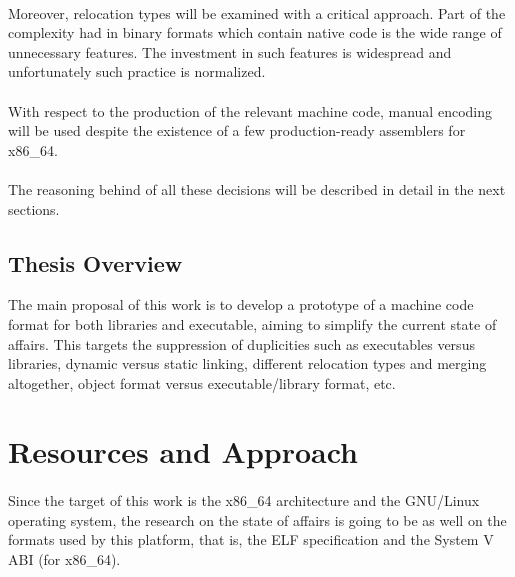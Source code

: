 \documentclass[12pt]{article}
\begin{document}
    \paragraph{}Moreover, relocation types will be examined with a critical approach. Part of the complexity had in binary formats which contain native code is the wide range of unnecessary features. The investment in such features is widespread and unfortunately such practice is normalized.
    
    \paragraph{} With respect to the production of the relevant machine code, manual encoding will be used despite the existence of a few production-ready assemblers for x86\_64. 
    
    \paragraph{} The reasoning behind of all these decisions will be described in detail in the next sections.

%	

	\subsection{Thesis Overview}
	The main proposal of this work is to develop a prototype of a machine code format for both libraries and executable, aiming to simplify the current state of affairs. This targets the suppression of duplicities such as executables versus libraries, dynamic versus static linking, different relocation types and merging altogether, object format versus executable/library format, etc.
	
	\newpage
	\section{Resources and Approach}
	
	\paragraph{}Since the target of this work is the x86\_64 architecture and the GNU/Linux operating system, the research on the state of affairs is going to be as well on the formats used by this platform, that is, the ELF specification and the System V ABI (for x86\_64).
\end{document}
